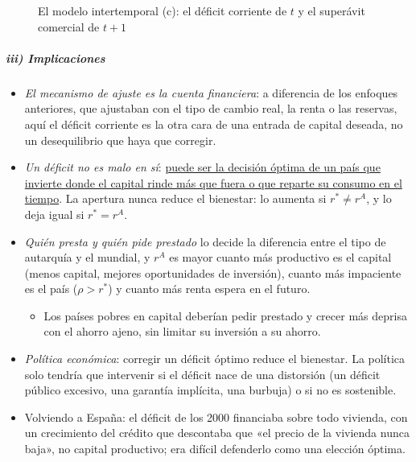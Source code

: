\documentclass[11pt]{article}
\begin{document}
\begin{figure}[H]
\centering
\caption{El modelo intertemporal (c): el déficit corriente de $t$ y el superávit comercial de $t+1$}\label{fig:cc-intertemporal}
\end{figure}

\subparagraph{iii) Implicaciones}

\begin{itemize}
\item \emph{El mecanismo de ajuste es la cuenta financiera}: a diferencia de los enfoques anteriores, que ajustaban con el tipo de cambio real, la renta o las reservas, aquí el déficit corriente es la otra cara de una entrada de capital deseada, no un desequilibrio que haya que corregir.
\item \emph{Un déficit no es malo en sí}: \uline{puede ser la decisión óptima de un país que invierte donde el capital rinde más que fuera o que reparte su consumo en el tiempo}. La apertura nunca reduce el bienestar: lo aumenta si $r^*\neq r^A$, y lo deja igual si $r^*=r^A$.
\item \emph{Quién presta y quién pide prestado} lo decide la diferencia entre el tipo de autarquía y el mundial, y $r^A$ es mayor cuanto más productivo es el capital (menos capital, mejores oportunidades de inversión), cuanto más impaciente es el país ($\rho>r^*$) y cuanto más renta espera en el futuro.
  \begin{itemize}
  \item Los países pobres en capital deberían pedir prestado y crecer más deprisa con el ahorro ajeno, sin limitar su inversión a su ahorro.
  \end{itemize}
\item \emph{Política económica}: corregir un déficit óptimo reduce el bienestar. La política solo tendría que intervenir si el déficit nace de una distorsión (un déficit público excesivo, una garantía implícita, una burbuja) o si no es sostenible.
\item Volviendo a España: el déficit de los 2000 financiaba sobre todo vivienda, con un crecimiento del crédito que descontaba que «el precio de la vivienda nunca baja», no capital productivo; era difícil defenderlo como una elección óptima.
\end{itemize}
\end{document}
